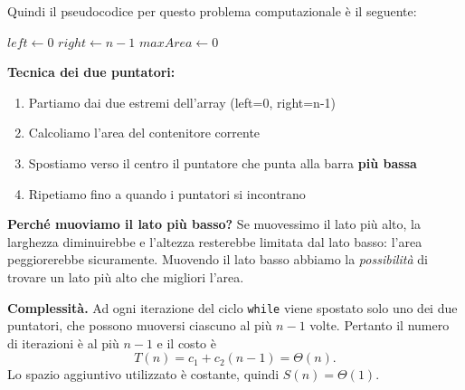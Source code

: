 Quindi il pseudocodice per questo problema computazionale è il seguente:

\begin{algorithm}[H]
	\caption{Container With Most Water}
	\label{alg:container-most-water}
	
	
	$left \gets 0$
	$right \gets n - 1$
	$maxArea \gets 0$
	
\end{algorithm}

\begin{softnote}
	\textbf{Tecnica dei due puntatori:}
	
	\begin{enumerate}
		\item Partiamo dai due estremi dell'array (left=0, right=n-1)
		\item Calcoliamo l'area del contenitore corrente
		\item Spostiamo verso il centro il puntatore che punta alla barra \textbf{più bassa}
		\item Ripetiamo fino a quando i puntatori si incontrano
	\end{enumerate}
	
	\textbf{Perché muoviamo il lato più basso?} Se muovessimo il lato più alto, la larghezza diminuirebbe e l'altezza resterebbe limitata dal lato basso: l'area peggiorerebbe sicuramente. Muovendo il lato basso abbiamo la \textit{possibilità} di trovare un lato più alto che migliori l'area.
\end{softnote}

\textbf{Complessità.}
Ad ogni iterazione del ciclo \texttt{while} viene spostato
solo uno dei due puntatori, che possono muoversi ciascuno al più $n-1$ volte.
Pertanto il numero di iterazioni è al più $n-1$ e il costo è
\[
T(n) = c_1 + c_2 (n-1) = \Theta(n).
\]
Lo spazio aggiuntivo utilizzato è costante, quindi $S(n) = \Theta(1)$.

